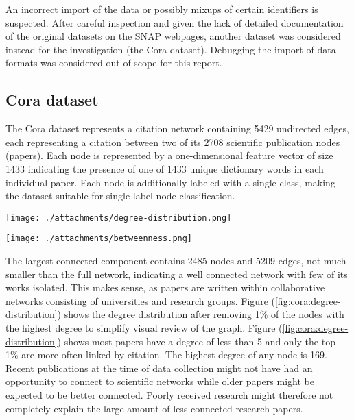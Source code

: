 \documentclass[a4paper,10pt]{article}
\begin{document}
An incorrect import of the data or possibly mixups of certain identifiers is suspected. After careful inspection and given the lack of detailed documentation of the original datasets on the SNAP webpages, another dataset was considered instead for the investigation (the Cora dataset). Debugging the import of data formats was considered out-of-scope for this report.

\subsection{Cora dataset}

The Cora dataset represents a citation network containing 5429 undirected edges, each representing a citation between two of its 2708 scientific publication nodes (papers). Each node is represented by a one-dimensional feature vector of size 1433 indicating the presence of one of 1433 unique dictionary words in each individual paper. Each node is additionally labeled with a single class, making the dataset suitable for single label node classification.

\begin{minipage}[c][17em]{0.45\textwidth}
  \texttt{[image: ./attachments/degree-distribution.png]}
  \label{fig:cora:degree-distribution}
\end{minipage}
\hfill
\begin{minipage}[c][17em]{0.45\textwidth}
  \texttt{[image: ./attachments/betweenness.png]}
  \label{fig:cora:betweenness-distribution}
\end{minipage}

The largest connected component contains 2485 nodes and 5209 edges, not much smaller than the full network, indicating a well connected network with few of its works isolated. This makes sense, as papers are written within collaborative networks consisting of universities and research groups. Figure (\ref{fig:cora:degree-distribution}) shows the degree distribution after removing 1\% of the nodes with the highest degree to simplify visual review of the graph. Figure (\ref{fig:cora:degree-distribution}) shows most papers have a degree of less than 5 and only the top 1\% are more often linked by citation. The highest degree of any node is 169. Recent publications at the time of data collection might not have had an opportunity to connect to scientific networks while older papers might be expected to be better connected. Poorly received research might therefore not completely explain the large amount of less connected research papers.
\end{document}
